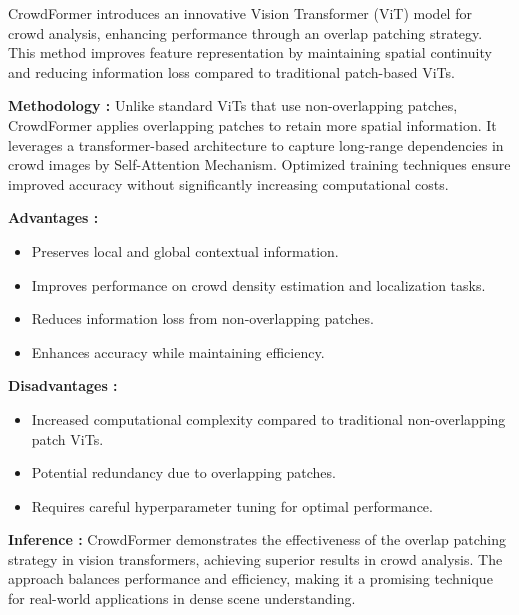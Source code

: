 \documentclass[11pt]{report}
\begin{document}
CrowdFormer introduces an innovative Vision Transformer (ViT) model for crowd analysis, enhancing performance through an overlap patching strategy. This method improves feature representation by maintaining spatial continuity and reducing information loss compared to traditional patch-based ViTs.

\textbf{Methodology :} Unlike standard ViTs that use non-overlapping patches, CrowdFormer applies overlapping patches to retain more spatial information. It leverages a transformer-based architecture to capture long-range dependencies in crowd images by Self-Attention Mechanism. Optimized training techniques ensure improved accuracy without significantly increasing computational costs.

\textbf{Advantages : }
\begin{itemize}
    \item Preserves local and global contextual information.
    \item Improves performance on crowd density estimation and localization tasks.
    \item Reduces information loss from non-overlapping patches.
    \item Enhances accuracy while maintaining efficiency.
\end{itemize}

\textbf{Disadvantages : }
\begin{itemize}
    \item Increased computational complexity compared to traditional non-overlapping patch ViTs.
    \item Potential redundancy due to overlapping patches.
    \item Requires careful hyperparameter tuning for optimal performance.
\end{itemize}

\textbf{Inference : }
CrowdFormer demonstrates the effectiveness of the overlap patching strategy in vision transformers, achieving superior results in crowd analysis. The approach balances performance and efficiency, making it a promising technique for real-world applications in dense scene understanding.
\end{document}

